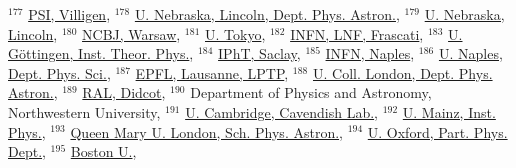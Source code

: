 {$^{177}$ \href{http://inspirehep.net/record/905405}{PSI, Villigen}, $^{178}$ \href{http://inspirehep.net/record/903057}{U. Nebraska, Lincoln, Dept. Phys. Astron.}, $^{179}$ \href{http://inspirehep.net/record/1273761}{U. Nebraska, Lincoln}, $^{180}$ \href{http://inspirehep.net/record/1658555}{NCBJ, Warsaw}, $^{181}$ \href{http://inspirehep.net/record/1209632}{U. Tokyo}, $^{182}$ \href{http://inspirehep.net/record/902807}{INFN, LNF, Frascati}, $^{183}$ \href{http://inspirehep.net/record/902826}{U. G\"ottingen, Inst. Theor. Phys.}, $^{184}$ \href{http://inspirehep.net/record/1087875}{IPhT, Saclay}, $^{185}$ \href{http://inspirehep.net/record/902883}{INFN, Naples}, $^{186}$ \href{http://inspirehep.net/record/903043}{U. Naples, Dept. Phys. Sci.}, $^{187}$ \href{http://inspirehep.net/record/1471035}{EPFL, Lausanne, LPTP}, $^{188}$ \href{http://inspirehep.net/record/903311}{U. Coll. London, Dept. Phys. Astron.}, $^{189}$ \href{http://inspirehep.net/record/903174}{RAL, Didcot}, $^{190}$ Department of Physics and Astronomy, Northwestern University, $^{191}$ \href{http://inspirehep.net/record/902712}{U. Cambridge, Cavendish Lab.}, $^{192}$ \href{http://inspirehep.net/record/902982}{U. Mainz, Inst. Phys.}, $^{193}$ \href{http://inspirehep.net/record/903146}{Queen Mary U. London, Sch. Phys. Astron.}, $^{194}$ \href{http://inspirehep.net/record/903112}{U. Oxford, Part. Phys. Dept.}, $^{195}$ \href{http://inspirehep.net/record/945903}{Boston U.},  }\normalsize